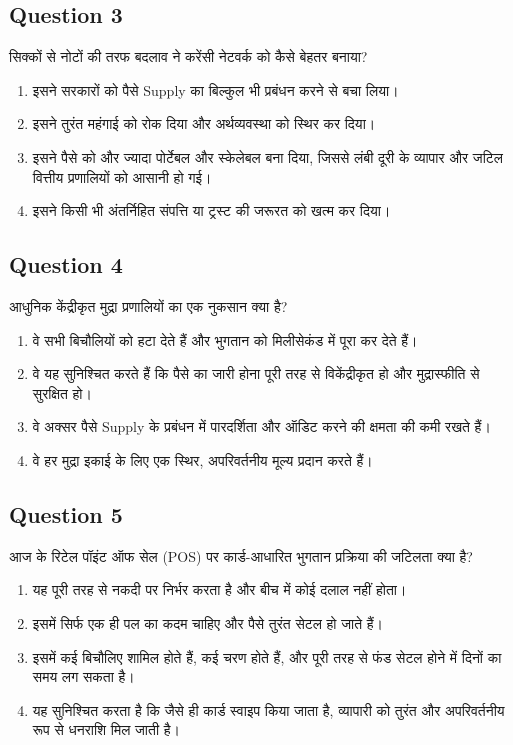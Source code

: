 \documentclass[12pt,a4paper]{article}
\begin{document}
\subsection*{Question 3}
सिक्कों से नोटों की तरफ बदलाव ने करेंसी नेटवर्क को कैसे बेहतर बनाया?

\begin{enumerate}[label=\Alph*., leftmargin=*]
\item इसने सरकारों को पैसे Supply का बिल्कुल भी प्रबंधन करने से बचा लिया।
\item इसने तुरंत महंगाई को रोक दिया और अर्थव्यवस्था को स्थिर कर दिया।
\item इसने पैसे को और ज्यादा पोर्टेबल और स्केलेबल बना दिया, जिससे लंबी दूरी के व्यापार और जटिल वित्तीय प्रणालियों को आसानी हो गई।
\item इसने किसी भी अंतर्निहित संपत्ति या ट्रस्ट की जरूरत को खत्म कर दिया।
\end{enumerate}

\bigskip


\subsection*{Question 4}
आधुनिक केंद्रीकृत मुद्रा प्रणालियों का एक नुकसान क्या है?

\begin{enumerate}[label=\Alph*., leftmargin=*]
\item वे सभी बिचौलियों को हटा देते हैं और भुगतान को मिलीसेकंड में पूरा कर देते हैं।
\item वे यह सुनिश्चित करते हैं कि पैसे का जारी होना पूरी तरह से विकेंद्रीकृत हो और मुद्रास्फीति से सुरक्षित हो।
\item वे अक्सर पैसे Supply के प्रबंधन में पारदर्शिता और ऑडिट करने की क्षमता की कमी रखते हैं।
\item वे हर मुद्रा इकाई के लिए एक स्थिर, अपरिवर्तनीय मूल्य प्रदान करते हैं।
\end{enumerate}

\bigskip


\subsection*{Question 5}
आज के रिटेल पॉइंट ऑफ सेल (POS) पर कार्ड-आधारित भुगतान प्रक्रिया की जटिलता क्या है?

\begin{enumerate}[label=\Alph*., leftmargin=*]
\item यह पूरी तरह से नकदी पर निर्भर करता है और बीच में कोई दलाल नहीं होता।
\item इसमें सिर्फ एक ही पल का कदम चाहिए और पैसे तुरंत सेटल हो जाते हैं।
\item इसमें कई बिचौलिए शामिल होते हैं, कई चरण होते हैं, और पूरी तरह से फंड सेटल होने में दिनों का समय लग सकता है।
\item यह सुनिश्चित करता है कि जैसे ही कार्ड स्वाइप किया जाता है, व्यापारी को तुरंत और अपरिवर्तनीय रूप से धनराशि मिल जाती है।
\end{enumerate}
\end{document}
